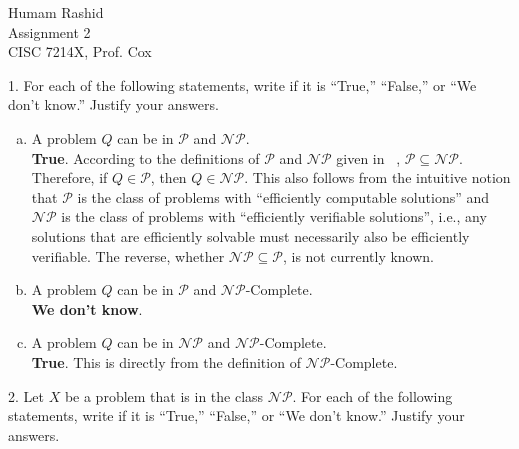 \documentclass{scrartcl}
\begin{document}
\begin{flushleft}

    Humam Rashid\\
    Assignment 2\\
    CISC 7214X, Prof. Cox\\
    \bigskip

    1. For each of the following statements, write if it is ``True,'' ``False,'' or ``We don't
    know.'' Justify your answers.\\
    \begin{enumerate}[(a)]
        \item A problem $Q$ can be in $\mathcal{P}$ and $\mathcal{NP}$.\\
            \medskip
            \textbf{True}. According to the definitions of $\mathcal{P}$ and $\mathcal{NP}$ given in
            ~\cite{modernapp}, $\mathcal{P} \subseteq \mathcal{NP}$. Therefore, if $Q \in
            \mathcal{P}$, then $Q \in \mathcal{NP}$. This also follows from the intuitive notion
            that $\mathcal{P}$ is the class of problems with ``efficiently computable solutions''
            and $\mathcal{NP}$ is the class of problems with ``efficiently verifiable solutions'',
            i.e., any solutions that are efficiently solvable must necessarily also be efficiently
            verifiable. The reverse, whether $\mathcal{NP} \subseteq \mathcal{P}$, is not currently
            known.
        \item A problem $Q$ can be in $\mathcal{P}$ and $\mathcal{NP}$-Complete.\\
            \medskip
            \textbf{We don't know}.
        \item A problem $Q$ can be in $\mathcal{NP}$ and $\mathcal{NP}$-Complete.\\
            \medskip
            \textbf{True}. This is directly from the definition of $\mathcal{NP}$-Complete.
    \end{enumerate}
    2. Let $X$ be a problem that is in the class $\mathcal{NP}$. For each of the following
    statements, write if it is ``True,'' ``False,'' or ``We don't know.'' Justify your answers.\\

\end{flushleft}
\end{document}
